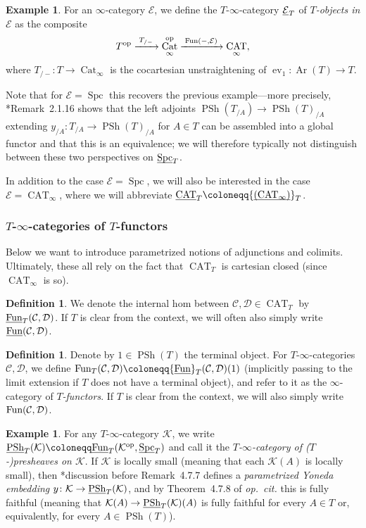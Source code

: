 \documentclass[reqno]{memo-l}
\theoremstyle{mythm}
\theoremstyle{definition}
\newtheorem{ex}[thm]{Example}
\newtheorem{definition}[thm]{Definition}
\numberwithin{equation}{section}
\newcommand{\Cc}{{\mathcal{C}}}
\newcommand{\Dd}{{\mathcal{D}}}
\newcommand{\Ee}{{\mathcal{E}}}
\newcommand{\Kk}{{\mathcal{K}}}
\DeclareMathOperator{\ev}{ev}
\DeclareMathOperator{\Spc}{Spc}
\DeclareMathOperator{\Cat}{Cat}
\DeclareMathOperator{\CAT}{CAT}
\newcommand{\Fun}{{\textup{Fun}}}
\DeclareMathOperator{\PSh}{PSh}
\DeclareMathOperator{\Ar}{Ar}
\newcommand{\op}{{\textup{op}}}
\newcommand{\ulhelper}[2]{\underline{\setbox0=\hbox{$#1#2$}\dp0=0.4pt \box0\relax}}
\newcommand{\ul}[1]{{\mathpalette\ulhelper{#1}}\hbox{\rule[-2pt]{0pt}{0pt}}}
\begin{document}
\begin{ex}\label{ex:T-objects}
    For an $\infty$-category $\Ee$, we define the $T$-$\infty$-category $\ul\Ee_T$ of \emph{$T$-objects in $\Ee$} as the composite
    \[
        T^\op\xrightarrow{\;T_{/-}\;}\Cat_\infty^\op\xrightarrow{\;\Fun(-,\Ee)\;}\CAT_\infty,
    \]
    where $T_{/-}\colon T\to\Cat_\infty$ is the cocartesian unstraightening of $\ev_1\colon\Ar(T)\to T$.

    Note that for $\Ee=\Spc$ this recovers the previous example---more precisely, \cite{CLL_Global}*{Remark~2.1.16} shows that the left adjoints $\PSh(T_{/A})\to\PSh(T)_{/A}$ extending $y_{/A}\colon T_{/A}\to \PSh(T)_{/A}$ for $A\in T$ can be assembled into a global functor and that this is an equivalence; we will therefore typically not distinguish between these two perspectives on $\ul\Spc_T$.

    In addition to the case $\Ee=\Spc$, we will also be interested in the case $\Ee=\CAT_\infty$, where we will abbreviate $\ul\CAT_T\coloneqq\ul{(\CAT_\infty)}_T$.
\end{ex}

\subsubsection{$T$-$\infty$-categories of $T$-functors} Below we want to introduce parametrized notions of adjunctions and colimits. Ultimately, these all rely on the fact that $\CAT_T$ is cartesian closed (since $\CAT_\infty$ is so). 

\begin{definition}
    We denote the internal hom between $\Cc,\Dd\in\CAT_T$ by $\ul\Fun_T(\Cc,\Dd)$. If $T$ is clear from the context, we will often also simply write $\ul\Fun(\Cc,\Dd)$.
\end{definition}

\begin{definition}
    Denote by $1\in\PSh(T)$ the terminal object. 
    For $T$-$\infty$-categories $\Cc,\Dd$, we define $\Fun_T(\Cc,\Dd)\coloneqq\ul\Fun_T(\Cc,\Dd)(1)$ (implicitly passing to the limit extension if $T$ does not have a terminal object), and refer to it as the $\infty$-category of \emph{$T$-functors}.  If $T$ is clear from the context, we will also simply write $\Fun(\Cc,\Dd)$.
\end{definition}

\begin{ex}\label{ex:yoneda}
    For any $T$-$\infty$-category $\Kk$, we write $\ul\PSh_T\hskip0pt minus 1pt(\Kk)\hskip0pt minus 1pt\coloneqq\hskip0pt minus 1pt\ul\Fun_T\hskip0pt minus 1pt(\Kk^\op\hskip0pt minus 1.5pt,\hskip0pt minus 1pt\ul\Spc_T\hskip0pt minus 1pt)$ and call it the \emph{$T$-$\infty$-category of (\kern1pt$T$-)presheaves on $\Kk$}. If $\Kk$ is locally small (meaning that each $\Kk(A)$ is locally small), then \cite{martini2021yoneda}*{discussion before Remark~4.7.7} defines a \emph{parametrized Yoneda embedding} $y\colon\Kk\to\ul\PSh_T(\Kk)$, and by Theorem~4.7.8 of \emph{op.\ cit.} this is fully faithful (meaning that $\Kk(A)\to\ul\PSh_T(\Kk)(A)$ is fully faithful for every $A\in T$ or, equivalently, for every $A\in\PSh(T)$).
\end{ex}
\end{document}
